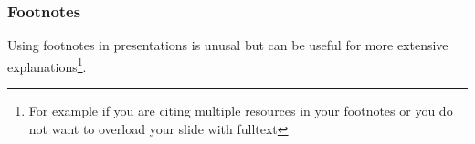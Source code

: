     \begin{frame}
        \frametitle{Footnotes}
        Using footnotes in presentations is unusal but can be useful for more extensive explanations\footnote{For example if you are citing multiple resources in your footnotes or you do not want to overload your slide with fulltext}.
    \end{frame}
    